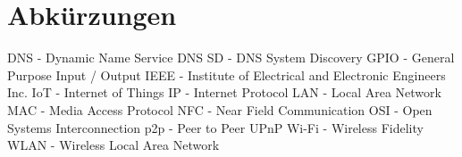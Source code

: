 \documentclass[12pt,a4paper]{article}
\begin{document}
    \section{Abkürzungen}
        DNS - Dynamic Name Service
        DNS SD - DNS System Discovery
        GPIO - General Purpose Input / Output
        IEEE - Institute of Electrical and Electronic Engineers Inc.
        IoT - Internet of Things
        IP - Internet Protocol
        LAN - Local Area Network
        MAC - Media Access Protocol
        NFC - Near Field Communication
        OSI - Open Systems Interconnection
        p2p - Peer to Peer
        UPnP
        Wi-Fi - Wireless Fidelity
        WLAN - Wireless Local Area Network
\end{document}
